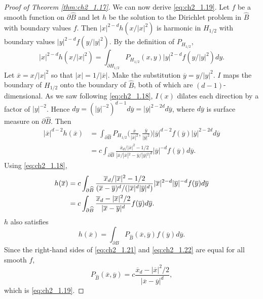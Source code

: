 \begin{proof}[Proof of Theorem \ref{thm:ch2_1.17}]
We can now derive \eqref{eq:ch2_1.19}. Let $f$ be a smooth function on $\partial\widehat{B}$ and let $h$ be the solution to the Dirichlet problem in $\widehat{B}$ with boundary values $f$. Then $|x|^{2-d}h(x/|x|^2)$ is harmonic in $H_{1/2}$ with boundary values $|y|^{2-d}f(y/|y|^2)$. By the definition of $P_{H_{1/2}}$,
\[
    |x|^{2-d}h(x/|x|^2) = \int_{\partial H_{1/2}} P_{H_{1/2}}(x,y)|y|^{2-d}f(y/|y|^2)dy.
\]
Let $\overline{x} = x/|x|^2$ so that $|x| = 1/|\overline{x}|$. Make the substitution $\overline{y} = y/|y|^2$. $I$ maps the boundary of $H_{1/2}$ onto the boundary of $\widehat{B}$, both of which are $(d-1)$-dimensional. As we saw following \eqref{eq:ch2_1.18}, $I(x)$ dilates each direction by a factor of $|y|^{-2}$. Hence $dy = (|\overline{y}|^{-2})^{d-1}d\overline{y} = |\overline{y}|^{2-2d}d\overline{y}$, where $d\overline{y}$ is surface measure on $\partial\widehat{B}$. Then
\begin{align*}
    |\overline{x}|^{d-2}h(\overline{x}) &= \int_{\partial\widehat{B}} P_{H_{1/2}}\Big(\frac{\overline{x}}{|\overline{x}|^2},\frac{\overline{y}}{|\overline{y}|^2}\Big)|\overline{y}|^{d-2}f(\overline{y})|\overline{y}|^{2-2d}d\overline{y} \\
    &= c \int_{\partial\widehat{B}}\frac{\overline{x}_d/|\overline{x}|^2 - 1/2}{|\overline{x}/|\overline{x}|^2 - \overline{y}/|\overline{y}|^2|^d}|\overline{y}|^{-d}f(\overline{y})d\overline{y}.
\end{align*}
Using \eqref{eq:ch2_1.18},
\begin{align}\label{eq:ch2_1.21}
    h(\overline{x}) &= c \int_{\partial\widehat{B}} \frac{\overline{x}_d/|\overline{x}|^2 - 1/2}{(\overline{x}-\overline{y})^d/(|\overline{x}|^d|\overline{y}|^d)}|\overline{x}|^{2-d}|\overline{y}|^{-d}f(\overline{y})d\overline{y} \\
    &= c \int_{\partial\widehat{B}} \frac{\overline{x}_d - |\overline{x}|^2/2}{|\overline{x}-\overline{y}|^d}f(\overline{y})d\overline{y}. \notag
\end{align}
$h$ also satisfies
\begin{equation}\label{eq:ch2_1.22}
    h(\overline{x}) = \int_{\partial\widehat{B}} P_{\widehat{B}}(\overline{x},\overline{y})f(\overline{y})d\overline{y}.
\end{equation}
Since the right-hand sides of \eqref{eq:ch2_1.21} and \eqref{eq:ch2_1.22} are equal for all smooth $f$,
\[
    P_{\widehat{B}}(\overline{x},\overline{y}) = c\frac{\overline{x}_d - |\overline{x}|^2/2}{|\overline{x}-\overline{y}|^d},
\]
which is \eqref{eq:ch2_1.19}.
\end{proof}


